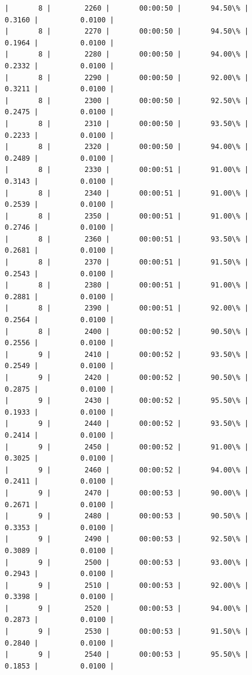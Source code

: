 \documentclass[11pt]{article}
\begin{document}
\begin{Verbatim}[commandchars=\\\{\}]
|       8 |        2260 |       00:00:50 |       94.50\% |       0.3160 |          0.0100 |
|       8 |        2270 |       00:00:50 |       94.50\% |       0.1964 |          0.0100 |
|       8 |        2280 |       00:00:50 |       94.00\% |       0.2332 |          0.0100 |
|       8 |        2290 |       00:00:50 |       92.00\% |       0.3211 |          0.0100 |
|       8 |        2300 |       00:00:50 |       92.50\% |       0.2475 |          0.0100 |
|       8 |        2310 |       00:00:50 |       93.50\% |       0.2233 |          0.0100 |
|       8 |        2320 |       00:00:50 |       94.00\% |       0.2489 |          0.0100 |
|       8 |        2330 |       00:00:51 |       91.00\% |       0.3143 |          0.0100 |
|       8 |        2340 |       00:00:51 |       91.00\% |       0.2539 |          0.0100 |
|       8 |        2350 |       00:00:51 |       91.00\% |       0.2746 |          0.0100 |
|       8 |        2360 |       00:00:51 |       93.50\% |       0.2681 |          0.0100 |
|       8 |        2370 |       00:00:51 |       91.50\% |       0.2543 |          0.0100 |
|       8 |        2380 |       00:00:51 |       91.00\% |       0.2881 |          0.0100 |
|       8 |        2390 |       00:00:51 |       92.00\% |       0.2564 |          0.0100 |
|       8 |        2400 |       00:00:52 |       90.50\% |       0.2556 |          0.0100 |
|       9 |        2410 |       00:00:52 |       93.50\% |       0.2549 |          0.0100 |
|       9 |        2420 |       00:00:52 |       90.50\% |       0.2875 |          0.0100 |
|       9 |        2430 |       00:00:52 |       95.50\% |       0.1933 |          0.0100 |
|       9 |        2440 |       00:00:52 |       93.50\% |       0.2414 |          0.0100 |
|       9 |        2450 |       00:00:52 |       91.00\% |       0.3025 |          0.0100 |
|       9 |        2460 |       00:00:52 |       94.00\% |       0.2411 |          0.0100 |
|       9 |        2470 |       00:00:53 |       90.00\% |       0.2671 |          0.0100 |
|       9 |        2480 |       00:00:53 |       90.50\% |       0.3353 |          0.0100 |
|       9 |        2490 |       00:00:53 |       92.50\% |       0.3089 |          0.0100 |
|       9 |        2500 |       00:00:53 |       93.00\% |       0.2943 |          0.0100 |
|       9 |        2510 |       00:00:53 |       92.00\% |       0.3398 |          0.0100 |
|       9 |        2520 |       00:00:53 |       94.00\% |       0.2873 |          0.0100 |
|       9 |        2530 |       00:00:53 |       91.50\% |       0.2840 |          0.0100 |
|       9 |        2540 |       00:00:53 |       95.50\% |       0.1853 |          0.0100 |

\end{Verbatim}
\end{document}
